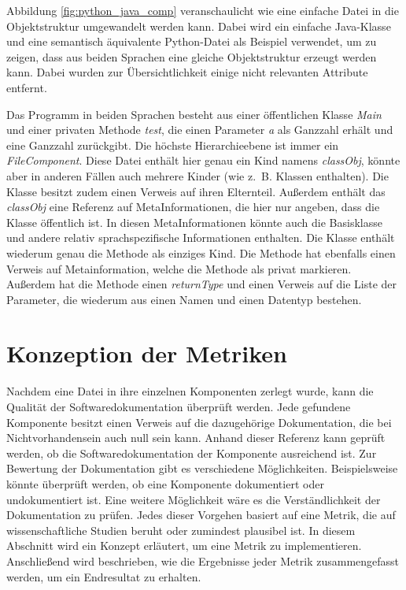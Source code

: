 Abbildung \ref{fig:python_java_comp} veranschaulicht wie eine einfache Datei in die Objektstruktur umgewandelt werden kann. Dabei wird ein einfache Java-Klasse und eine semantisch äquivalente Python-Datei als Beispiel verwendet, um zu zeigen, dass aus beiden Sprachen eine gleiche Objektstruktur erzeugt werden kann. Dabei wurden zur Übersichtlichkeit einige nicht relevanten Attribute entfernt.

Das Programm in beiden Sprachen besteht aus einer öffentlichen Klasse \textit{Main} und einer privaten Methode \textit{test}, die einen Parameter \textit{a} als Ganzzahl erhält und eine Ganzzahl zurückgibt. Die höchste Hierarchieebene ist immer ein \textit{FileComponent}. Diese Datei enthält hier genau ein Kind namens \textit{classObj}, könnte aber in anderen Fällen auch mehrere Kinder (wie z.~B. Klassen enthalten). Die Klasse besitzt zudem einen Verweis auf ihren Elternteil. Außerdem enthält das \textit{classObj} eine Referenz auf MetaInformationen, die hier nur angeben, dass die Klasse öffentlich ist. In diesen MetaInformationen könnte auch die Basisklasse und andere relativ sprachspezifische Informationen enthalten. Die Klasse enthält wiederum genau die Methode als einziges Kind. Die Methode hat ebenfalls einen Verweis auf Metainformation, welche die Methode als privat markieren. Außerdem hat die Methode einen \textit{returnType} und einen Verweis auf die Liste der Parameter, die wiederum aus einen Namen und einen Datentyp bestehen.


\section{Konzeption der Metriken}
Nachdem eine Datei in ihre einzelnen Komponenten zerlegt wurde, kann die Qualität der Softwaredokumentation überprüft werden. Jede gefundene Komponente besitzt einen Verweis auf die dazugehörige Dokumentation, die bei Nichtvorhandensein auch null sein kann. Anhand dieser Referenz kann geprüft werden, ob die Softwaredokumentation der Komponente ausreichend ist. Zur Bewertung der Dokumentation gibt es verschiedene  Möglichkeiten. Beispielsweise könnte überprüft werden, ob eine Komponente dokumentiert oder undokumentiert ist. Eine weitere Möglichkeit wäre es die Verständlichkeit der Dokumentation zu prüfen. Jedes dieser Vorgehen basiert auf eine Metrik, die auf wissenschaftliche Studien beruht oder zumindest plausibel ist. In diesem Abschnitt wird ein Konzept erläutert, um eine Metrik zu implementieren. Anschließend wird beschrieben, wie die Ergebnisse jeder Metrik zusammengefasst werden, um ein Endresultat zu erhalten. 

